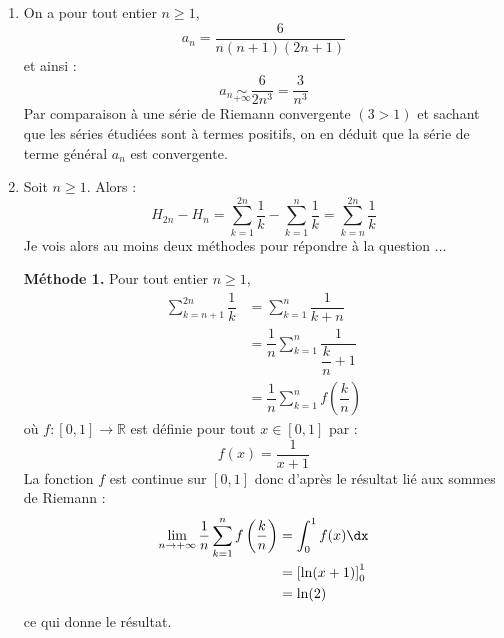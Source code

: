 \documentclass[a4paper,10pt]{report}
\begin{document}
\corr 
\begin{enumerate}
\item On a pour tout entier $n \geq 1$,
$$ a_n = \dfrac{6}{n(n+1)(2n+1)}$$
et ainsi :
$$ a_n \underset{+ \infty}{\sim} \dfrac{6}{2n^3}= \dfrac{3}{n^3}$$
Par comparaison à une série de Riemann convergente $(3>1)$ et sachant que les séries étudiées sont à termes positifs, on en déduit que la série de terme général $a_n$ est convergente.
\item Soit $n \geq 1$. Alors :
$$ H_{2n}-H_n = \sum_{k=1}^{2n} \dfrac{1}{k} - \sum_{k=1}^{n} \dfrac{1}{k} = \sum_{k=n}^{2n} \dfrac{1}{k}$$
Je vois alors au moins deux méthodes pour répondre à la question ...

\medskip

\noindent \textbf{Méthode 1.} Pour tout entier $n \geq 1$,
\begin{align*}
\sum_{k=n+1}^{2n} \dfrac{1}{k} & = \sum_{k=1}^{n} \dfrac{1}{k+n} \\
& = \dfrac{1}{n} \sum_{k=1}^{n} \dfrac{1}{\dfrac{k}{n} +1} \\
& =  \dfrac{1}{n} \sum_{k=1}^n f \left( \dfrac{k}{n} \right)
\end{align*}
où $f : [0,1] \rightarrow \mathbb{R}$ est définie pour tout $x \in [0,1]$ par :
$$ f(x) = \dfrac{1}{x+1}$$
La fonction $f$ est continue sur $[0,1]$ donc d'après le résultat lié aux sommes de Riemann :
\begin{align*}
\lim_{n \rightarrow + \infty} \dfrac{1}{n} \sum_{k=1}^n f \left( \dfrac{k}{n} \right) & = \int_{0}^1 f(x) \dx \\
& = \left[\ln(x+1) \right]_0^1 \\
& = \ln(2) \\
\end{align*}
ce qui donne le résultat.

\medskip


\end{enumerate}
\end{document}
